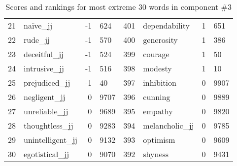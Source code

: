 \begin{table}[tbp]
\begin{tabular}{| rlr@{.}l | rlr@{.}l |}
    21 & naïve\_jj & -1 & 624    &    401 & dependability & 1 & 651 \\
    22 & rude\_jj & -1 & 570    &    400 & generosity & 1 & 386 \\
    23 & deceitful\_jj & -1 & 524    &    399 & courage & 1 & 50 \\
    24 & intrusive\_jj & -1 & 516    &    398 & modesty & 1 & 10 \\
    25 & prejudiced\_jj & -1 & 40    &    397 & inhibition & 0 & 9907 \\
    26 & negligent\_jj & 0 & 9707    &    396 & cunning & 0 & 9889 \\
    27 & unreliable\_jj & 0 & 9689    &    395 & empathy & 0 & 9820 \\
    28 & thoughtless\_jj & 0 & 9283    &    394 & melancholic\_jj & 0 & 9785 \\
    29 & unintelligent\_jj & 0 & 9132    &    393 & optimism & 0 & 9609 \\
    30 & egotistical\_jj & 0 & 9070    &    392 & shyness & 0 & 9431 \\
    \hline
    \end{tabular}
    \caption{Scores and rankings for most extreme 30 words in component \#3} 
\end{table}
\clearpage
